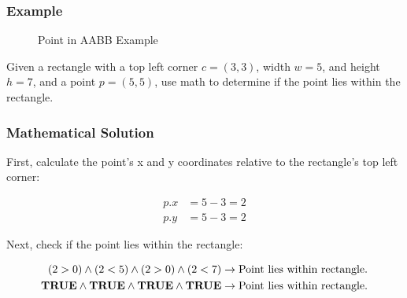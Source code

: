 \subsubsection{Example}

\begin{figure}[H]
    \begin{center}

        \caption{Point in AABB Example}
    \end{center}
\end{figure}

Given a rectangle with a top left corner $c = (3, 3)$, width $w = 5$, and
height $h = 7$, and a point $p = (5, 5)$, use math to determine if the point
lies within the rectangle.

\subsubsection{Mathematical Solution}
First, calculate the point's x and y coordinates relative to the rectangle's
top left corner:

\begin{equation*}
    \begin{aligned}
        p.x & = 5 - 3 = 2 \\
        p.y & = 5 - 3 = 2
    \end{aligned}
\end{equation*}

Next, check if the point lies within the rectangle:

\begin{equation*}
    \begin{aligned}
        (2 > 0) \land (2 < 5) \land (2 > 0) \land (2 < 7) \rightarrow \text{Point lies within rectangle}. \\
        \textnormal{\textbf{TRUE}} \land \textnormal{\textbf{TRUE}} \land \textnormal{\textbf{TRUE}} \land \textnormal{\textbf{TRUE}} \rightarrow \text{Point lies within rectangle}.
    \end{aligned}
\end{equation*}

